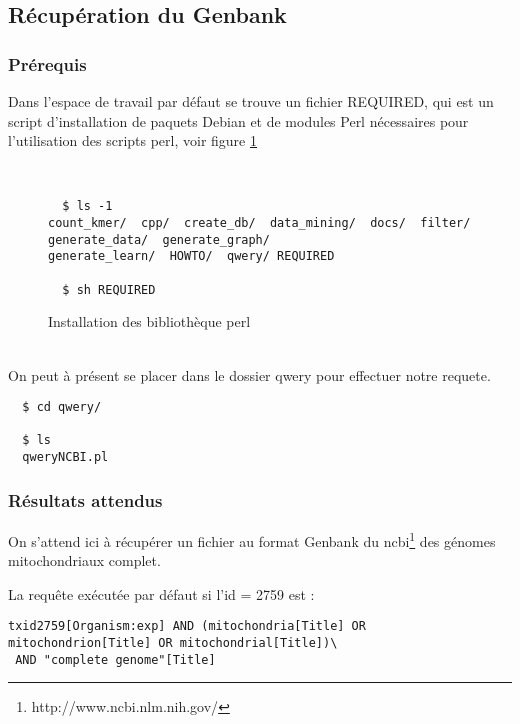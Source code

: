 \subsection{Récupération du Genbank}
\label{qwery}
\subsubsection{Prérequis}

Dans l'espace de travail par défaut se trouve un fichier REQUIRED, qui est un
script d'installation de paquets Debian et de modules Perl nécessaires  pour l'utilisation des scripts perl, voir figure \ref{installPerl}

~\\
\begin{figure}[H]

\begin{center}
\begin{verbatim}
  $ ls -1
count_kmer/  cpp/  create_db/  data_mining/  docs/  filter/ generate_data/  generate_graph/  
generate_learn/  HOWTO/  qwery/ REQUIRED

  $ sh REQUIRED
\end{verbatim}


\end{center}
\caption{\label{installPerl}Installation des bibliothèque perl}
\end{figure}
~\\

On peut à présent se placer dans le dossier qwery pour effectuer notre requete.

\begin{verbatim}
  $ cd qwery/
  
  $ ls
  qweryNCBI.pl
\end{verbatim}

\subsubsection{Résultats attendus}

On s'attend ici à récupérer un fichier au format Genbank du ncbi\footnote{http://www.ncbi.nlm.nih.gov/} des génomes
mitochondriaux complet.

La requête exécutée par défaut si l'id = 2759 est : 
\begin{verbatim}
txid2759[Organism:exp] AND (mitochondria[Title] OR mitochondrion[Title] OR mitochondrial[Title])\
 AND "complete genome"[Title]
\end{verbatim}

